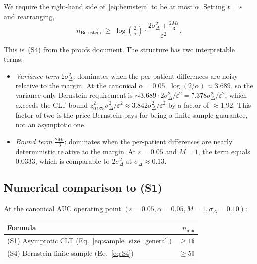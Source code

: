 \documentclass[twoside,11pt]{article}
\begin{document}
We require the right-hand side of~\eqref{eq:bernstein} to be at most $\alpha$. Setting $t = \varepsilon$ and rearranging,
\begin{equation}
    \boxed{\;n_{\text{Bernstein}} \;\geq\; \log\!\left(\tfrac{2}{\alpha}\right) \cdot \frac{2\sigma_\Delta^2 + \tfrac{2 M \varepsilon}{3}}{\varepsilon^2}.\;}
    \label{eq:S4}
\end{equation}

This is~(S4) from the proofs document. The structure has two interpretable terms:

\begin{itemize}
    \item \textit{Variance term} $2 \sigma_\Delta^2$: dominates when the per-patient differences are noisy relative to the margin. At the canonical $\alpha = 0.05$, $\log(2/\alpha) \approx 3.689$, so the variance-only Bernstein requirement is $\sim 3.689 \cdot 2 \sigma_\Delta^2 / \varepsilon^2 = 7.378 \sigma_\Delta^2 / \varepsilon^2$, which exceeds the CLT bound $z_{0.975}^2 \sigma_\Delta^2 / \varepsilon^2 \approx 3.842 \sigma_\Delta^2 / \varepsilon^2$ by a factor of $\approx 1.92$. This factor-of-two is the price Bernstein pays for being a finite-sample guarantee, not an asymptotic one.
    \item \textit{Bound term} $\tfrac{2 M \varepsilon}{3}$: dominates when the per-patient differences are nearly deterministic relative to the margin. At $\varepsilon = 0.05$ and $M = 1$, the term equals $0.0333$, which is comparable to $2\sigma_\Delta^2$ at $\sigma_\Delta \approx 0.13$.
\end{itemize}

\subsection{Numerical comparison to (S1)}

At the canonical AUC operating point $(\varepsilon = 0.05, \alpha = 0.05, M = 1, \sigma_\Delta = 0.10)$:

\begin{table}[h]
    \centering
    \begin{tabular}{lr}
        \toprule
        \textbf{Formula} & \textbf{$n_{\min}$} \\
        \midrule
        (S1) Asymptotic CLT (Eq.~\ref{eq:sample_size_general})         & $\geq 16$ \\
        (S4) Bernstein finite-sample (Eq.~\ref{eq:S4})                 & $\geq 50$ \\
        \bottomrule
    \end{tabular}
\end{table}
\end{document}
